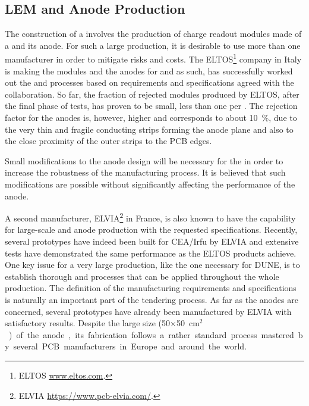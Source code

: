 \subsection{LEM and Anode Production}
\label{sec:fddp-crp-LASprod}


The construction of a  %
 involves the production of \dpnumswch charge readout modules made of a  and its anode. For such a large production, it is desirable to use more than one manufacturer in order to mitigate risks and costs. The ELTOS\footnote{ ELTOS\texttrademark{} \url{www.eltos.com}.} company in Italy is making the  modules and the anodes for   and as such, has successfully worked out the  and  processes based on requirements and specifications agreed with the  collaboration. So far, the fraction of rejected  modules produced by ELTOS, after the final phase of tests, has proven to be small, less than one  per . The rejection factor for the anodes is, however, higher and corresponds to about \SI{10}{\%}, due to the very thin and fragile conducting strips forming the anode plane and also to the close proximity of the outer strips to the PCB edges. 


Small modifications to the anode design will be necessary for the  in order to increase the robustness of the manufacturing process. It is believed that such modifications are possible without  %
significantly affecting the performance of the anode.   

A second manufacturer, ELVIA\footnote{ELVIA\texttrademark{} \url{https://www.pcb-elvia.com/}.} in France, is also known to have the capability for large-scale  and anode production with the requested specifications. Recently, several  prototypes have indeed been built for CEA/Irfu 
by ELVIA and extensive tests have %
demonstrated the same   performance as the ELTOS products achieve.
 One key issue for a very large production, like the one necessary for DUNE, is to establish thorough  and  processes that can be applied throughout the whole  production. The definition of the  manufacturing requirements and specifications is naturally an important part of the tendering process. As far as the anodes are concerned, several prototypes have already been manufactured by ELVIA with satisfactory results. Despite the large size (\num{50}$\times$\SI{50}{cm$^2$}) of the anode, its fabrication follows a rather standard process mastered by several PCB manufacturers in Europe and around the world.     

